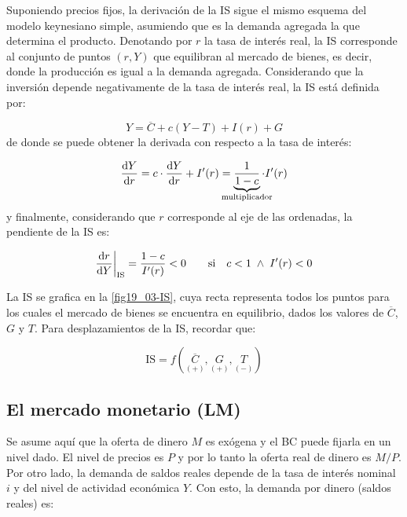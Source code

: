 \documentclass[DeGregorioResumen]{subfiles}
\begin{document}
Suponiendo precios fijos, la derivación de la IS sigue el mismo esquema del modelo keynesiano simple, asumiendo que es la demanda agregada la que determina el producto. Denotando por $r$ la tasa de interés real, la IS corresponde al conjunto de puntos $(r,Y)$ que equilibran al mercado de bienes, es decir, donde la producción es igual a la demanda agregada. Considerando que la inversión depende negativamente de la tasa de interés real, la IS está definida por:

\begin{equation}
Y=\overline{C}+c(Y-T)+I(r)+G
\label{eq:IS}
\end{equation}
de donde se puede obtener la derivada con respecto a la tasa de interés:

\begin{equation*}
\deriv{Y}{r}=c\cdot \deriv{Y}{r} + I'(r) = \underbrace{\frac{1}{1-c}}_{\mathclap{\text{multiplicador}}}\cdot I'(r)
\end{equation*}
y finalmente, considerando que $r$ corresponde al eje de las ordenadas, la pendiente de la IS es:

\begin{equation}
\frac{\mathrm{d}r}{\mathrm{d}Y}\bigg |_{\text{IS}} = \frac{1-c}{I'(r)} < 0 \qquad \text{si} \quad  c<1 \;\wedge\; I'(r)<0
\end{equation}

La IS se grafica en la \autoref{fig19_03-IS}, cuya recta representa todos los puntos para los cuales el mercado de bienes se encuentra en equilibrio, dados los valores de $\overline{C}$, $G$ y $T$. Para desplazamientos de la IS, recordar que:

\begin{equation*}
\text{IS}=f(\underset{(+)}{\overline{C}}, \underset{(+)}{G}, \underset{(-)}{T})
\end{equation*}



\subsection{El mercado monetario (LM)}

Se asume aquí que la oferta de dinero $M$ es exógena y el BC puede fijarla en un nivel dado. El nivel de precios es $P$ y por lo tanto la oferta real de dinero es $M/P$. Por otro lado, la demanda de saldos reales depende de la tasa de interés nominal $i$ y del nivel de actividad económica $Y$. Con esto, la demanda por dinero (saldos reales) es:
\end{document}

